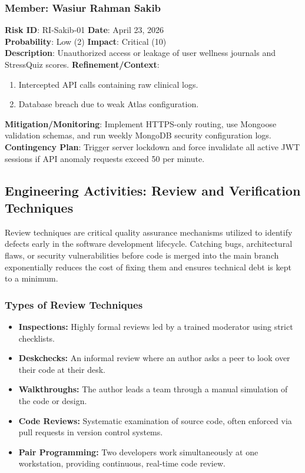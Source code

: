 \documentclass[a4paper,11pt]{report}
\begin{document}
\subsubsection{Member: Wasiur Rahman Sakib}
\textbf{Risk ID}: RI-Sakib-01 \hfill \textbf{Date}: April 23, 2026\\
\textbf{Probability}: Low (2) \hfill \textbf{Impact}: Critical (10) \\
\textbf{Description}: Unauthorized access or leakage of user wellness journals and StressQuiz scores.
\textbf{Refinement/Context}: 
\begin{enumerate}
    \item Intercepted API calls containing raw clinical logs.
    \item Database breach due to weak Atlas configuration.
\end{enumerate}
\textbf{Mitigation/Monitoring}: Implement HTTPS-only routing, use Mongoose validation schemas, and run weekly MongoDB security configuration logs.
\textbf{Contingency Plan}: Trigger server lockdown and force invalidate all active JWT sessions if API anomaly requests exceed 50 per minute.

\subsection{Engineering Activities: Review and Verification Techniques}
Review techniques are critical quality assurance mechanisms utilized to identify defects early in the software development lifecycle. Catching bugs, architectural flaws, or security vulnerabilities before code is merged into the main branch exponentially reduces the cost of fixing them and ensures technical debt is kept to a minimum.

\subsubsection{Types of Review Techniques}
\begin{itemize}
    \item \textbf{Inspections:} Highly formal reviews led by a trained moderator using strict checklists.
    \item \textbf{Deskchecks:} An informal review where an author asks a peer to look over their code at their desk.
    \item \textbf{Walkthroughs:} The author leads a team through a manual simulation of the code or design.
    \item \textbf{Code Reviews:} Systematic examination of source code, often enforced via pull requests in version control systems.
    \item \textbf{Pair Programming:} Two developers work simultaneously at one workstation, providing continuous, real-time code review.
\end{itemize}
\end{document}
